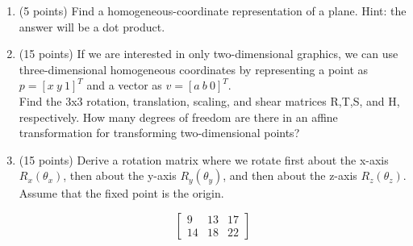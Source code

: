 \documentclass[13pt]{letter}
\begin{document}
\begin{enumerate}
	\item (5 points)
	Find a homogeneous-coordinate representation of a plane. Hint: the answer will be a dot product.
	
	\item (15 points)
	If we are interested in only two-dimensional graphics, we can use three-dimensional homogeneous coordinates by representing a point as $p = [x~y~1]^T$ and a vector as $v = [a~b~0]^T$. \\
	Find the 3x3 rotation, translation, scaling, and shear matrices R,T,S, and H, respectively. How many degrees of freedom are there in an affine transformation for transforming two-dimensional points?
	
	\item (15 points)
	Derive a rotation matrix where we rotate first about the x-axis $R_x(\theta_x)$, then about the y-axis $R_y(\theta_y)$, and then about the z-axis $R_z(\theta_z)$. Assume that the fixed point is the origin.
	
	$$\left[
	\begin {array}{ccc}
	9 & 13& 17\\
	14& 18& 22
	\end {array}
	\right]$$

\end{enumerate}
\end{document}
